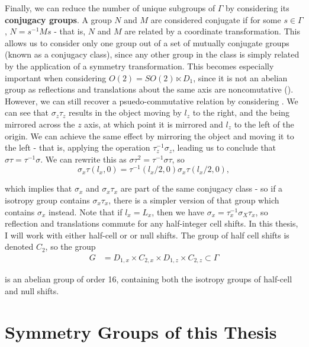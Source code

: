 Finally, we can reduce the number of unique subgroups of $\Gamma$ by considering its {\bf conjugacy groups}. A group $N$ and $M$ are considered conjugate if for some $s \in \Gamma$, $N = s^{-1}Ms$ - that is, $N$ and $M$ are related by a coordinate transformation. This allows us to consider only one group out of a set of mutually conjugate groups (known as a conjugacy class), since any other group in the class is simply related by the application of a symmetry transformation. This becomes especially important when considering $O(2) =  SO(2) \ltimes D_{1}$, since it is not an abelian group as reflections and translations about the same axis are noncomutative (). However, we can still recover a psuedo-commutative relation by considering . We can see that $\sigma_z\tau_z$ results in the object moving by $l_z$ to the right, and the being mirrored across the $z$ axis, at which point it is mirrored and $l_z$ to the left of the origin. We can achieve the same effect by mirroring the object and moving it to the left - that is, applying the operation $\tau_z^{-1}\sigma_z$, leading us to conclude that $\sigma\tau = \tau^{-1}\sigma$. We can rewrite this as $\sigma\tau^2 = \tau^{-1}\sigma\tau$, so
\begin{equation}
\sigma_x\tau(l_x,0) = \tau^{-1}(l_x/2,0)\sigma_x\tau(l_x/2,0),
\end{equation}

which implies that $\sigma_x$ and $\sigma_x\tau_x$ are part of the same conjugacy class - so if a isotropy group contains $\sigma_x\tau_x$, there is a simpler version of that group which contains $\sigma_x$ instead. Note that if $l_x = L_x$, then we have $\sigma_x = \tau_x^{-1}\sigma_X\tau_x$, so reflection and translations commute for any half-integer cell shifts. In this thesis, I will work with either half-cell or or null shifts. The group of half cell shifts is denoted $C_2$, so the group 
\begin{align}
G &= D_{1,x} \times C_{2,x} \times D_{1,z} \times C_{2,z} \subset \Gamma
\end{align} 

is an abelian group of order 16, containing both the isotropy groups of half-cell and null shifts.

\section{Symmetry Groups of this Thesis}

